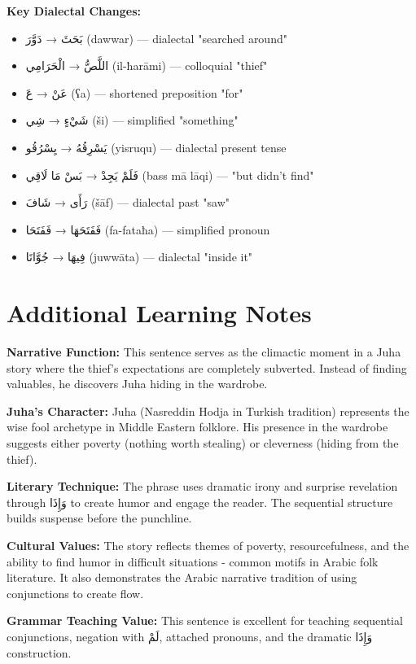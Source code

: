 \documentclass[letter,12pt]{article}
\begin{document}
\textbf{Key Dialectal Changes:}
\begin{itemize}
\item \textarabic{بَحَثَ} → \textarabic{دَوَّرَ} (dawwar) — dialectal "searched around"
\item \textarabic{اللَّصُّ} → \textarabic{الْحَرَامِي} (il-ħarāmi) — colloquial "thief"
\item \textarabic{عَنْ} → \textarabic{عَ} (ʕa) — shortened preposition "for"
\item \textarabic{شَيْءٍ} → \textarabic{شِي} (ši) — simplified "something"
\item \textarabic{يَسْرِقُهُ} → \textarabic{يِسْرُقُو} (yisruqu) — dialectal present tense
\item \textarabic{فَلَمْ يَجِدْ} → \textarabic{بَسْ مَا لَاقِي} (bass mā lāqi) — "but didn't find"
\item \textarabic{رَأَى} → \textarabic{شَافَ} (šāf) — dialectal past "saw"
\item \textarabic{فَفَتَحَهَا} → \textarabic{فَفَتَحَا} (fa-fataħa) — simplified pronoun
\item \textarabic{فِيهَا} → \textarabic{جُوَّاتَا} (juwwāta) — dialectal "inside it"
\end{itemize}

\section{Additional Learning Notes}

\begin{tcolorbox}[colback=boxcolor,colframe=accentcolor,title=\textbf{Cultural and Literary Context},breakable]
\textbf{Narrative Function:} This sentence serves as the climactic moment in a Juha story where the thief's expectations are completely subverted. Instead of finding valuables, he discovers Juha hiding in the wardrobe.

\textbf{Juha's Character:} Juha (Nasreddin Hodja in Turkish tradition) represents the wise fool archetype in Middle Eastern folklore. His presence in the wardrobe suggests either poverty (nothing worth stealing) or cleverness (hiding from the thief).

\textbf{Literary Technique:} The phrase uses dramatic irony and surprise revelation through \textarabic{وَإِذَا} to create humor and engage the reader. The sequential structure builds suspense before the punchline.

\textbf{Cultural Values:} The story reflects themes of poverty, resourcefulness, and the ability to find humor in difficult situations - common motifs in Arabic folk literature. It also demonstrates the Arabic narrative tradition of using conjunctions to create flow.

\textbf{Grammar Teaching Value:} This sentence is excellent for teaching sequential conjunctions, negation with \textarabic{لَمْ}, attached pronouns, and the dramatic \textarabic{وَإِذَا} construction.
\end{tcolorbox}
\end{document}
